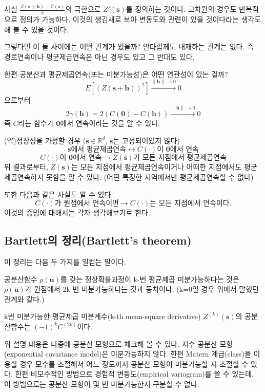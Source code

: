 \documentclass[b5paper,]{scrbook}
\theoremstyle{plain}
\theoremstyle{definition}
\numberwithin{equation}{section}
\let\BeginKnitrBlock\begin \let\EndKnitrBlock\end
\begin{document}
사실 \(\frac{Z(\mathbf{s}+\mathbf{h})-Z(\mathbf{s})}{h}\)의 극한으로
\(Z'(\mathbf{s})\)를 정의하는 것이다. 고차원의 경우도 반복적으로 정의가
가능하다. 이것의 생김새로 보아 변동도와 관련이 있을 것이다라는 생각도 해
볼 수 있을 것이다.

그렇다면 이 둘 사이에는 어떤 관계가 있을까? 안타깝께도 내재하는 관계는
없다. 즉 경로연속이나 평균제곱연속은 아닌 경우도 있고 그 반대도 있다.

한편 공분산과 평균제곱연속(또는 미분가능성)은 어떤 연관성이 있는 걸까?
\[E[(Z(\mathbf{s}+\mathbf{h}))^{2}] \stackrel{\|\mathbf{h}\| \rightarrow 0}{\rightarrow} 0\]
으로부터
\[2\gamma(\mathbf{h})=2(C(\mathbf{0})-C(\mathbf{h})) \stackrel{\|\mathbf{h}\| \rightarrow 0}{\rightarrow} 0\]
즉 \(C\)라는 함수가 \(\mathbf{0}\)에서 연속이라는 것을 알 수 있다.

(약)정상성을 가정할 경우 (\(\mathbf{s} \in \mathbb{R}^{d}\),
\(\mathbf{s}\)는 고정되어있지 않다)
\[ \mathbf{s} \text{에서 평균제곱연속} \leftrightarrow C(\cdot)\text{이 } \mathbf{0}\text{에서 연속}\]
\[C(\cdot)\text{이 } \mathbf{0}\text{에서 연속} \rightarrow Z(\mathbf{s})\text{가 모든 지점에서 평균제곱연속}\]
위 결과로부터, \(Z(\mathbf{s})\)는 모든 지점에서 평균제곱연속이거나
어떠한 지점에서도 평균제곱연속하지 못함을 알 수 있다. (어떤 특정한
지역에서만 평균제곱연속할 수 없다)

또한 다음과 같은 사실도 알 수 있다.
\[C(\cdot) \text{가 원점에서 연속이면} \rightarrow C(\cdot) \text{는 모든 지점에서 연속이다}.\]
이것의 증명에 대해서는 각자 생각해보기로 한다.

\subsection{Bartlett의 정리(Bartlett's
theorem)}\label{bartlett-bartletts-theorem}

이 정리는 다음 두 가지를 일컫는 말이다.

\BeginKnitrBlock{theorem}[Bartlett의 정리]
\protect\hypertarget{thm:unnamed-chunk-207}{}{\label{thm:unnamed-chunk-207}
{} }공분산함수 \(\rho(\mathbf{u})\)를 갖는
정상확률과정이 k-번 평균제곱 미분가능하다는 것은 \(\rho(\mathbf{u})\)가
원점에서 2k-번 미분가능하다는 것과 동치이다. (k=0일 경우 위에서 말했던
관계와 같다.)

k번 미분가능한 평균제곱 미분계수(k-th mean-square derivative)
\(Z^{(k)}(\mathbf{s})\)의 공분산함수는 \((-1)^{k}C^{(2k)}\)이다.
\EndKnitrBlock{theorem}

위 설명 내용은 나중에 공분산 모형으로 체크해 볼 수 있다. 지수 공분산
모형(exponential covariance model)은 미분가능하지 않다. 한편 Matern
계급(class)을 이용할 경우 모수를 조절해서 어느 정도까지 공분산 모형이
미분가능할 지 조절할 수 있다. 한편 비모수적인 방법으로 경험적
변동도(empirical variogram)를 쓸 수 있는데, 이 방법으로는 공분산 모형이
몇 번 미분가능한지 구분할 수 없다.
\end{document}
